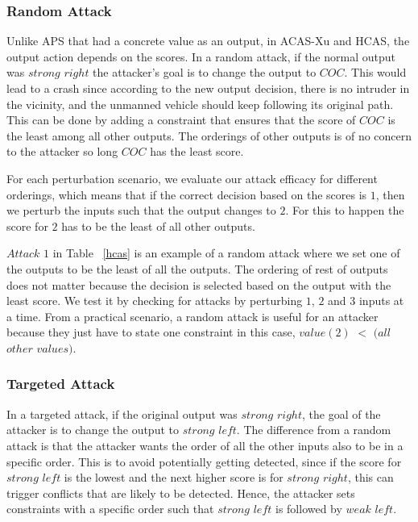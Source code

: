 \subsubsection{Random Attack}
Unlike \ac{APS} that had a concrete value as an output, in \ac{ACAS-Xu} and \ac{HCAS}, the output action depends on the scores. 
In a random attack, if the normal output was $strong$ $right$ the attacker's goal
is to change the output to $COC$.
This would lead to a crash since according to the new output decision, there is no intruder in the vicinity, and the unmanned vehicle should keep following its original path. 
This can be done by adding a constraint that ensures that the score of $COC$ is the least among all other outputs. 
The orderings of other outputs is of no concern to the attacker so long $COC$ has the least score. 

For each perturbation scenario, we evaluate our attack efficacy for different orderings, which means that if the correct decision based on the scores is $1$, then we perturb the inputs such that the output changes to $2$.
For this to happen the score for $2$ has to be the least of all other outputs. 

$Attack$ $1$ in Table ~\ref{hcas} is an example of a random attack where we set one of the outputs to be the least of all the outputs. 
The ordering of rest of outputs does not matter because the decision is selected based on the output with the least score. 
We test it by checking for attacks by perturbing $1$, $2$ and $3$ inputs at a time. 
From a practical scenario, a random attack is useful for an attacker because
they just have to state one constraint in this case, $value(2)$ $<$ $(all$ $other$ $values)$.

\subsubsection{Targeted Attack}

 
In a targeted attack, if the original output was $strong$ $right$, the goal of the attacker is to change the output to $strong$ $left$. 
The difference from a random attack is that the attacker wants the order of all the other inputs also to be in a specific order. 
This is to avoid potentially getting detected, since if the score for $strong$ $left$ is the lowest and the next higher score is for $strong$ $right$, this can trigger conflicts that are likely to be detected. 
Hence, the attacker sets constraints with a specific order such that $strong$ $left$ is followed by $weak$ $left$. 

